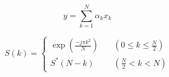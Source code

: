 
\begin{equation}
    y = \sum_{k = 1}^{N}{\alpha_{k}x_{k}}
    \label{formula:mre}
\end{equation}


\begin{equation}
    S(k) = 
    \begin{cases}
        \exp(\frac{-j \pi k^2}{N}) & \quad (0 \leq k \leq \frac{N}{2}) \\
        S^{*}(N-k) & \quad (\frac{N}{2} < k < N)
    \end{cases}
    \label{formula:ss}
\end{equation}
